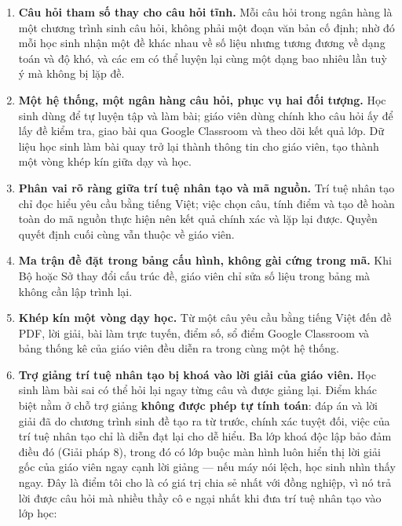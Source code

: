 \begin{enumerate}[label=(\arabic*), leftmargin=1.2cm, itemsep=2pt]
  \item \textbf{Câu hỏi tham số thay cho câu hỏi tĩnh.} Mỗi câu hỏi trong ngân
        hàng là một chương trình sinh câu hỏi, không phải một đoạn văn bản cố
        định; nhờ đó mỗi học sinh nhận một đề khác nhau về số liệu nhưng tương
        đương về dạng toán và độ khó, và các em có thể luyện lại cùng một dạng
        bao nhiêu lần tuỳ ý mà không bị lặp đề.
  \item \textbf{Một hệ thống, một ngân hàng câu hỏi, phục vụ hai đối tượng.}
        Học sinh dùng để tự luyện tập và làm bài; giáo viên dùng chính kho câu
        hỏi ấy để lấy đề kiểm tra, giao bài qua Google Classroom và theo dõi
        kết quả lớp. Dữ liệu học sinh làm bài quay trở lại thành thông tin cho
        giáo viên, tạo thành một vòng khép kín giữa dạy và học.
  \item \textbf{Phân vai rõ ràng giữa trí tuệ nhân tạo và mã nguồn.} Trí tuệ
        nhân tạo chỉ đọc hiểu yêu cầu bằng tiếng Việt; việc chọn câu, tính điểm
        và tạo đề hoàn toàn do mã nguồn thực hiện nên kết quả chính xác và lặp
        lại được. Quyền quyết định cuối cùng vẫn thuộc về giáo viên.
  \item \textbf{Ma trận đề đặt trong bảng cấu hình, không gài cứng trong mã.}
        Khi Bộ hoặc Sở thay đổi cấu trúc đề, giáo viên chỉ sửa số liệu trong
        bảng mà không cần lập trình lại.
  \item \textbf{Khép kín một vòng dạy học.} Từ một câu yêu cầu bằng tiếng Việt
        đến đề PDF, lời giải, bài làm trực tuyến, điểm số, sổ điểm Google
        Classroom và bảng thống kê của giáo viên đều diễn ra trong cùng một hệ
        thống.
  \item \textbf{Trợ giảng trí tuệ nhân tạo bị khoá vào lời giải của giáo viên.}
        Học sinh làm bài sai có thể hỏi lại ngay từng câu và được giảng lại.
        Điểm khác biệt nằm ở chỗ trợ giảng \textbf{không được phép tự tính
        toán}: đáp án và lời giải đã do chương trình sinh đề tạo ra từ trước,
        chính xác tuyệt đối, việc của trí tuệ nhân tạo chỉ là diễn đạt lại cho
        dễ hiểu. Ba lớp khoá độc lập bảo đảm điều đó (Giải pháp 8), trong đó có
        lớp buộc màn hình luôn hiển thị lời giải gốc của giáo viên ngay cạnh
        lời giảng --- nếu máy nói lệch, học sinh nhìn thấy ngay. Đây là điểm tôi
        cho là có giá trị chia sẻ nhất với đồng nghiệp, vì nó trả lời được câu
        hỏi mà nhiều thầy cô e ngại nhất khi đưa trí tuệ nhân tạo vào lớp học:

\end{enumerate}
